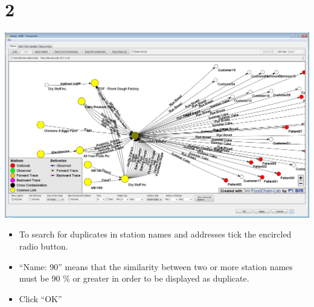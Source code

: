 \documentclass[10pt]{beamer}
\begin{document}
\section{2}
\begin{frame}
	\begin{center}
			\includegraphics[scale=0.4]{2.png}
	\end{center}
	\begin{itemize}
		\item To search for duplicates in station names and addresses tick the encircled radio button.
		\item ``Name: 90'' means that the similarity between two or more station names must be 90 \% or greater in order to be displayed as duplicate.
		\item Click ``OK''
	\end{itemize}
\end{frame}
\end{document}
